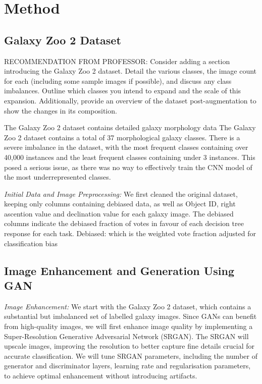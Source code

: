 \documentclass[10pt,twocolumn,letterpaper]{article}
\begin{document}
\section{Method}
\subsection{Galaxy Zoo 2 Dataset}
RECOMMENDATION FROM PROFESSOR:
Consider adding a section introducing the Galaxy Zoo 2 dataset. 
Detail the various classes, the image count for each (including some sample images if possible), and discuss any class imbalances. 
Outline which classes you intend to expand and the scale of this expansion. 
Additionally, provide an overview of the dataset post-augmentation to show the changes in its composition.

The Galaxy Zoo 2 dataset contains detailed galaxy morphology data 
The Galaxy Zoo 2 dataset contains a total of 37 morphological galaxy classes.
There is a severe imbalance in the dataset, with the most frequent classes containing over 40,000 instances and the least frequent classes containing under 3 instances.
This posed a serious issue, as there was no way to effectively train the CNN model of the most underrepresented classes.

\textit{Initial Data and Image Preprocessing:} We first cleaned the original dataset, keeping only columns containing debiased data, as well as Object ID, right ascention value and declination value for each galaxy image.
The debiased columns indicate the debiased fraction of votes in favour of each decision tree response for each task.
Debiased: which is the weighted vote fraction adjusted for classification bias

\subsection{Image Enhancement and Generation Using GAN}
\textit{Image Enhancement:} We start with the Galaxy Zoo 2 dataset, which contains a substantial but imbalanced set of labelled galaxy images. 
Since GANs can benefit from high-quality images, we will first enhance image quality by implementing a Super-Resolution Generative Adversarial Network (SRGAN). 
The SRGAN will upscale images, improving the resolution to better capture fine details crucial for accurate classification. 
We will tune SRGAN parameters, including the number of generator and discriminator layers, learning rate and regularisation parameters, to achieve optimal enhancement without introducing artifacts.
\end{document}
